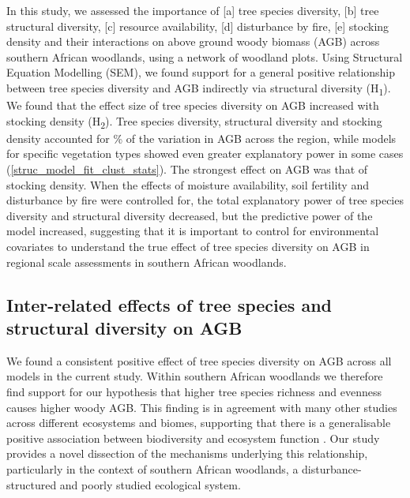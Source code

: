 \documentclass[11pt,a4paper]{article}
\begin{document}
In this study, we assessed the importance of [a] tree species diversity, [b] tree structural diversity, [c] resource availability, [d] disturbance by fire, [e] stocking density and their interactions on above ground woody biomass (AGB) across southern African woodlands, using a network of \nplots{} woodland plots. Using Structural Equation Modelling (SEM), we found support for a general positive relationship between tree species diversity and AGB indirectly via structural diversity (H\textsubscript{1}). We found that the effect size of tree species diversity on AGB increased with stocking density (H\textsubscript{2}).  Tree species diversity, structural diversity and stocking density accounted for \smrsq{}\% of the variation in AGB across the region, while models for specific vegetation types showed even greater explanatory power in some cases (\autoref{struc_model_fit_clust_stats}). The strongest effect on AGB was that of stocking density. When the effects of moisture availability, soil fertility and disturbance by fire were controlled for, the total explanatory power of tree species diversity and structural diversity decreased, but the predictive power of the model increased, suggesting that it is important to control for environmental covariates to understand the true effect of tree species diversity on AGB in regional scale assessments in southern African woodlands.

\subsection{Inter-related effects of tree species and structural diversity on AGB}

We found a consistent positive effect of tree species diversity on AGB across all models in the current study. Within southern African woodlands we therefore find support for our hypothesis that higher tree species richness and evenness causes higher woody AGB. This finding is in agreement with many other studies across different ecosystems and biomes, supporting  that there is a generalisable positive association between biodiversity and ecosystem function \citep{Liang2016, Cardinale2009}. Our study provides a novel dissection of the mechanisms underlying this relationship, particularly in the context of southern African woodlands, a disturbance-structured and poorly studied ecological system.

\end{document}
